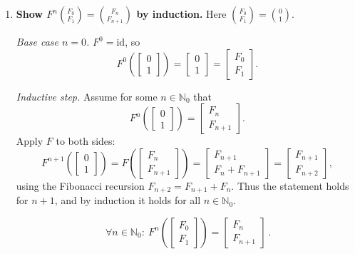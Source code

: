 \documentclass[12pt]{article}
\newcommand{\F}{\mathbb{F}}
\begin{document}
\begin{enumerate}[label=(\alph*)]
\item \textbf{Show $F^n\binom{F_0}{F_1}=\binom{F_n}{F_{n+1}}$ by induction.}
Here $\binom{F_0}{F_1}=\binom{0}{1}$.

\emph{Base case $n=0$.} $F^0=\mathrm{id}$, so
\[
F^0\!\left(\begin{bmatrix}0\\1\end{bmatrix}\right)=\begin{bmatrix}0\\1\end{bmatrix}
=
\begin{bmatrix}F_0\\F_1\end{bmatrix}.
\]

\emph{Inductive step.} Assume for some $n\in\mathbb{N}_0$ that
\[
F^n\!\left(\begin{bmatrix}0\\1\end{bmatrix}\right)=\begin{bmatrix}F_n\\F_{n+1}\end{bmatrix}.
\]
Apply $F$ to both sides:
\[
F^{n+1}\!\left(\begin{bmatrix}0\\1\end{bmatrix}\right)
=
F\!\left(\begin{bmatrix}F_n\\F_{n+1}\end{bmatrix}\right)
=
\begin{bmatrix}F_{n+1}\\F_n+F_{n+1}\end{bmatrix}
=
\begin{bmatrix}F_{n+1}\\F_{n+2}\end{bmatrix},
\]
using the Fibonacci recursion $F_{n+2}=F_{n+1}+F_n$.
Thus the statement holds for $n+1$, and by induction it holds for all $n\in\mathbb{N}_0$.

\[
\boxed{\,\forall n\in\mathbb{N}_0:\ 
F^n\!\left(\begin{bmatrix}F_0\\F_1\end{bmatrix}\right)
=
\begin{bmatrix}F_n\\F_{n+1}\end{bmatrix}\, }.
\]


\end{enumerate}
\end{document}
